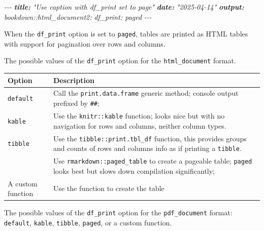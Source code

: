 \documentclass[
  a4paper,
  twoside,
  openright]{book}
\newenvironment{Shaded}{\begin{snugshade}}{\end{snugshade}}
\newcommand{\AnnotationTok}[1]{\textcolor[rgb]{0.56,0.35,0.01}{\textbf{\textit{#1}}}}
\newcommand{\CommentTok}[1]{\textcolor[rgb]{0.56,0.35,0.01}{\textit{#1}}}
\theoremstyle{definition}
\theoremstyle{definition}
\theoremstyle{definition}
\theoremstyle{definition}
\theoremstyle{remark}
\begin{document}
\begin{Shaded}
\begin{Highlighting}[]
\CommentTok{{-}{-}{-}}
\AnnotationTok{title:}\CommentTok{ "Use caption with df\_print set to page"}
\AnnotationTok{date:}\CommentTok{ "2025{-}04{-}14"}
\AnnotationTok{output:}
\CommentTok{  bookdown::html\_document2:}
\CommentTok{    df\_print: paged}
\CommentTok{{-}{-}{-}}
\end{Highlighting}
\end{Shaded}

When the \texttt{df\_print} option is set to \texttt{paged}, tables are printed as HTML tables with support for pagination over rows and columns.

The possible values of the \texttt{df\_print} option for the \texttt{html\_document} format.

\begin{longtable}[]{@{}
  >{\raggedright\arraybackslash}p{}
  >{\raggedright\arraybackslash}p{}@{}}
\toprule\noalign{}
\begin{minipage}[b]{\linewidth}\raggedright
Option
\end{minipage} & \begin{minipage}[b]{\linewidth}\raggedright
Description
\end{minipage} \\
\midrule\noalign{}
\endhead
\bottomrule\noalign{}
\endlastfoot
\texttt{default} & Call the \texttt{print.data.frame} generic method; console output prefixed by \texttt{\#\#}; \\
\texttt{kable} & Use the \texttt{knitr::kable} function; looks nice but with no navigation for rows and columns, neither column types. \\
\texttt{tibble} & Use the \texttt{tibble::print.tbl\_df} function, this provides groups and counts of rows and columns info as if printing a \texttt{tibble}. \\
{\texttt{paged}} & Use \texttt{rmarkdown::paged\_table} to create a pageable table; \texttt{paged} looks best but slows down compilation significantly; \\
A custom function & Use the function to create the table \\
\end{longtable}

The possible values of the \texttt{df\_print} option for the \texttt{pdf\_document} format: \texttt{default}, \texttt{kable}, \texttt{tibble}, \texttt{paged}, or a custom function.
\end{document}
